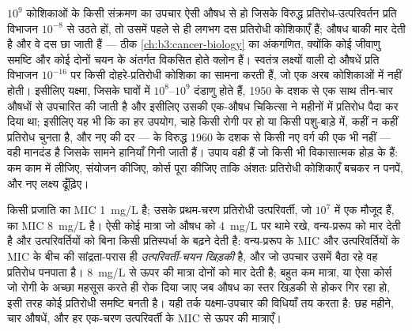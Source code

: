 \begin{proposition}[प्रतिरोध अनिवार्य क्यों है और उत्तर संयोजन क्यों है]\label{prop:b3:bacteriology:selection}
$10^{9}$ कोशिकाओं के किसी संक्रमण का उपचार ऐसी औषध से हो जिसके विरुद्ध
प्रतिरोध-उत्परिवर्तन प्रति विभाजन $10^{-8}$ से उठते हों, तो उसमें पहले
से ही लगभग दस प्रतिरोधी कोशिकाएँ हैं; औषध बाकी मार देती है और वे दस
छा जाती हैं --- ठीक \cref{ch:b3:cancer-biology} का अंकगणित, क्योंकि कोई
जीवाणु समष्टि और कोई  दोनों चयन के अंतर्गत विकसित होते क्लोन हैं।
स्वतंत्र लक्ष्यों वाली दो औषधें प्रति विभाजन $10^{-16}$ पर किसी
दोहरे-प्रतिरोधी कोशिका का सामना करती हैं, जो एक अरब कोशिकाओं में नहीं
होती। इसीलिए यक्ष्मा, जिसके घावों में $10^{8}$--$10^{9}$ दंडाणु होते
हैं, 1950 के दशक से एक साथ तीन-चार औषधों से उपचारित की जाती है और इसीलिए
उसकी एक-औषध चिकित्सा ने महीनों में प्रतिरोध पैदा कर दिया था; इसीलिए यह
भी कि  का हर उपयोग, चाहे किसी रोगी पर हो या किसी पशु-बाड़े
में, कहीं न कहीं प्रतिरोध चुनता है, और नए  की दर ---
 के विरुद्ध 1960 के दशक से किसी नए वर्ग की एक भी नहीं
--- वही मानदंड है जिसके सामने हानियाँ गिनी जाती हैं। उपाय वही हैं जो
किसी भी विकासात्मक होड़ के हैं: कम काम में लीजिए, संयोजन कीजिए, कोर्स
पूरा कीजिए ताकि अंशतः प्रतिरोधी कोशिकाएँ बचकर न पनपें, और नए लक्ष्य
ढूँढ़िए।
\end{proposition}

\begin{example}[उत्परिवर्ती-चयन खिड़की]\label{ex:b3:bacteriology:window}
किसी प्रजाति का MIC \qty{1}{mg/L} है; उसके प्रथम-चरण प्रतिरोधी
उत्परिवर्ती, जो $10^{7}$ में एक मौजूद हैं, का MIC \qty{8}{mg/L} है।
ऐसी कोई मात्रा जो औषध को \qty{4}{mg/L} पर थामे रखे, वन्य-प्ररूप को मार
देती है और उत्परिवर्तियों को बिना किसी प्रतिस्पर्धा के बढ़ने देती है:
वन्य-प्ररूप के MIC और उत्परिवर्तियों के MIC के बीच की सांद्रता-परास ही
\emph{उत्परिवर्ती-चयन खिड़की} है, और जो उपचार उसमें बैठा रहे वह
प्रतिरोध पनपाता है। \qty{8}{mg/L} से ऊपर की मात्रा दोनों को मार देती है;
बहुत कम मात्रा, या ऐसा कोर्स जो रोगी के अच्छा महसूस करते ही रोक दिया
जाए जब औषध का स्तर खिड़की से होकर गिर रहा हो, इसी तरह कोई प्रतिरोधी
समष्टि बनती है। यही तर्क यक्ष्मा-उपचार की विधियाँ तय करता है: छह
महीने, चार औषधें, और हर एक-चरण उत्परिवर्ती के MIC से ऊपर की मात्राएँ।
\end{example}

